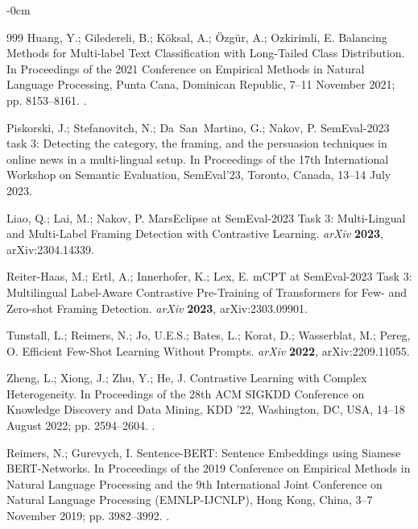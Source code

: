 \documentclass[make,article,accept,pdftex,moreauthors]{Definitions/mdpi}
\begin{document}
\begin{adjustwidth}{-\extralength}{0cm}
\begin{thebibliography}{999}
Huang, Y.; Giledereli, B.; K{\"o}ksal, A.; {\"O}zg{\"u}r, A.; Ozkirimli, E.
\newblock Balancing Methods for Multi-label Text Classification with
  Long-Tailed Class Distribution.
\newblock In Proceedings of the 2021 Conference on Empirical
  Methods in Natural Language Processing,
Punta Cana, Dominican Republic, 7--11 November 2021; pp.
  8153--8161.
.

Piskorski, J.; Stefanovitch, N.; Da~San~Martino, G.; Nakov, P.
\newblock SemEval-2023 task 3: Detecting the category, the framing, and the
  persuasion techniques in online news in a multi-lingual setup.
\newblock In Proceedings of the 17th International
  Workshop on Semantic Evaluation, SemEval’23, Toronto, Canada, 13--14 July 2023.

Liao, Q.; Lai, M.; Nakov, P.
\newblock MarsEclipse at SemEval-2023 Task 3: Multi-Lingual and Multi-Label
  Framing Detection with Contrastive Learning. \emph{arXiv} \textbf{2023}, arXiv:2304.14339.

Reiter-Haas, M.; Ertl, A.; Innerhofer, K.; Lex, E.
\newblock mCPT at SemEval-2023 Task 3: Multilingual Label-Aware Contrastive
  Pre-Training of Transformers for Few- and Zero-shot Framing Detection. \emph{arXiv} \textbf{2023}, arXiv:2303.09901.

Tunstall, L.; Reimers, N.; Jo, U.E.S.; Bates, L.; Korat, D.; Wasserblat, M.;
  Pereg, O.
\newblock Efficient Few-Shot Learning Without Prompts. \emph{arXiv} \textbf{2022}, arXiv:2209.11055.

Zheng, L.; Xiong, J.; Zhu, Y.; He, J.
\newblock Contrastive Learning with Complex Heterogeneity.
\newblock In Proceedings of the 28th ACM SIGKDD Conference
  on Knowledge Discovery and Data Mining, KDD '22, Washington, DC, USA, 14--18 August 2022; pp.
  2594--2604.
.

Reimers, N.; Gurevych, I.
\newblock Sentence-{BERT}: Sentence Embeddings using {S}iamese {BERT}-Networks.
\newblock In Proceedings of the 2019 Conference on Empirical
  Methods in Natural Language Processing and the 9th International Joint
  Conference on Natural Language Processing (EMNLP-IJCNLP), Hong Kong, China,
 3--7 November 2019; pp. 3982--3992.
.


\end{thebibliography}
\end{adjustwidth}
\end{document}
